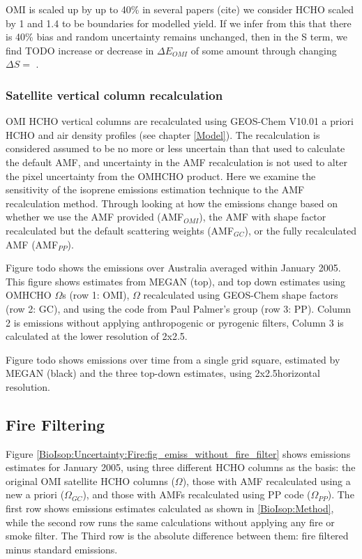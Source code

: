     OMI is scaled up by up to 40\% in several papers (cite) we consider HCHO scaled by 1 and 1.4 to be boundaries for modelled yield.
    If we infer from this that there is 40\% bias and random uncertainty remains unchanged, then in the S term, we find TODO increase or decrease in $\Delta{E_{OMI}}$ of some amount through changing $\Delta{S}=$ .
    
    
    \subsubsection{Satellite vertical column recalculation}
      \label{BioIsop:Uncertainty:Satellite:AMF}
      OMI HCHO vertical columns are recalculated using GEOS-Chem V10.01 a priori HCHO and air density profiles (see chapter \ref{Model}).
      The recalculation is considered assumed to be no more or less uncertain than that used to calculate the default AMF, and uncertainty in the AMF recalculation is not used to alter the pixel uncertainty from the OMHCHO product.
      Here we examine the sensitivity of the isoprene emissions estimation technique to the AMF recalculation method.
      Through looking at how the emissions change based on whether we use the AMF provided (AMF$_{OMI}$), the AMF with shape factor recalculated but the default scattering weights (AMF$_{GC}$), or the fully recalculated AMF (AMF$_{PP}$).
      
      Figure todo shows the emissions over Australia averaged within January 2005.
      This figure shows estimates from MEGAN (top), and top down estimates using OMHCHO $\Omega$s (row 1: OMI), $\Omega$ recalculated using GEOS-Chem shape factors (row 2: GC), and using the code from Paul Palmer's group (row 3: PP).
      Column 2 is emissions without applying anthropogenic or pyrogenic filters, Column 3 is calculated at the lower resolution of 2x2.5\degr.
      
      Figure todo shows emissions over time from a single grid square, estimated by MEGAN (black) and the three top-down estimates, using 2x2.5\degr horizontal resolution.
  
  \subsection{Fire Filtering}
    
    Figure \ref{BioIsop:Uncertainty:Fire:fig_emiss_without_fire_filter} shows emissions estimates for January 2005, using three different HCHO columns as the basis: the original OMI satellite HCHO columns ($\Omega$), those with AMF recalculated using a new a priori ($\Omega_{GC}$), and those with AMFs recalculated using PP code ($\Omega_{PP}$).
    The first row shows emissions estimates calculated as shown in \ref{BioIsop:Method}, while the second row runs the same calculations without applying any fire or smoke filter.
    The Third row is the absolute difference between them: fire filtered minus standard emissions.
    

